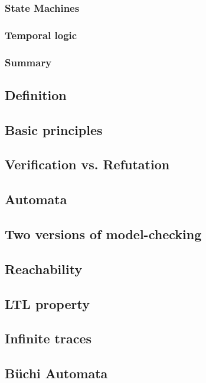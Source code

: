 \documentclass[12pt, a4paper]{book}
\begin{document}
  \subsubsection{State Machines}
  \label{subs:State Machines}
  \subsubsection{Temporal logic}
  \label{subs:Temporal logic}
  \subsubsection{Summary}
  \label{subs:Summary}
  \subsection{Definition}
  \label{sub:Definition}
  \subsection{Basic principles}
  \label{sub:Basic principles}
  \subsection{Verification vs. Refutation}
  \label{sub:Verification vs. Refutation}
  \subsection{Automata}
  \label{sub:Automata}
  \subsection{Two versions of model-checking}
  \label{sub:Two versions of model-checking}
  \subsection{Reachability}
  \label{sub:Reachability}
  \subsection{LTL property}
  \label{sub:LTL property}
  \subsection{Infinite traces}
  \label{sub:Infinite traces}
  \subsection{Büchi Automata}
  \label{sub:Büchi Automata}
\end{document}
